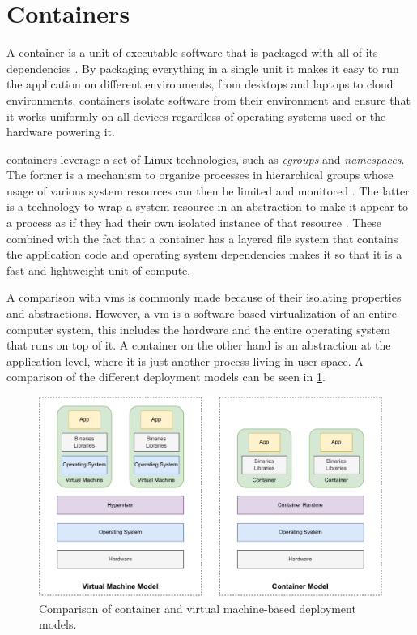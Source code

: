 \section{Containers}
\label{sec:background:containers}


A \gls{container} is a unit of executable software that is packaged with all of its dependencies \cite{docker-what-is-container, ibm-what-is-container}. By packaging everything in a single unit it makes it easy to run the application on different environments, from desktops and laptops to cloud environments. \Glspl{container} isolate software from their environment and ensure that it works uniformly on all devices regardless of operating systems used or the hardware powering it. 




\Glspl{container} leverage a set of Linux technologies, such as \textit{cgroups} and \textit{namespaces}. The former is a mechanism to organize processes in hierarchical groups whose usage of various system resources can then be limited and monitored \cite{cgroups, man-cgroups}. The latter is a technology to wrap a system resource in an abstraction to make it appear to a process as if they had their own isolated instance of that resource \cite{man-namespaces}. These combined with the fact that a container has a layered file system that contains the application code and operating system dependencies makes it so that it is a fast and lightweight unit of compute. 

A comparison with \glspl{vm} is commonly made because of their isolating properties and abstractions. However, a \gls{vm} is a software-based virtualization of an entire computer system, this includes the hardware and the entire operating system that runs on top of it. A \gls{container} on the other hand is an abstraction at the application level, where it is just another process living in user space. A comparison of the different deployment models can be seen in \cref{fig:vm-vs-container}.


\begin{figure}[!t]
    \centering
    
    \includegraphics[width=.9\linewidth]{2_background/figures/vm-vs-container.pdf}

    \caption[Container and virtual machine-based deployment models]{Comparison of container and virtual machine-based deployment models.}
    \label{fig:vm-vs-container}
\end{figure}

